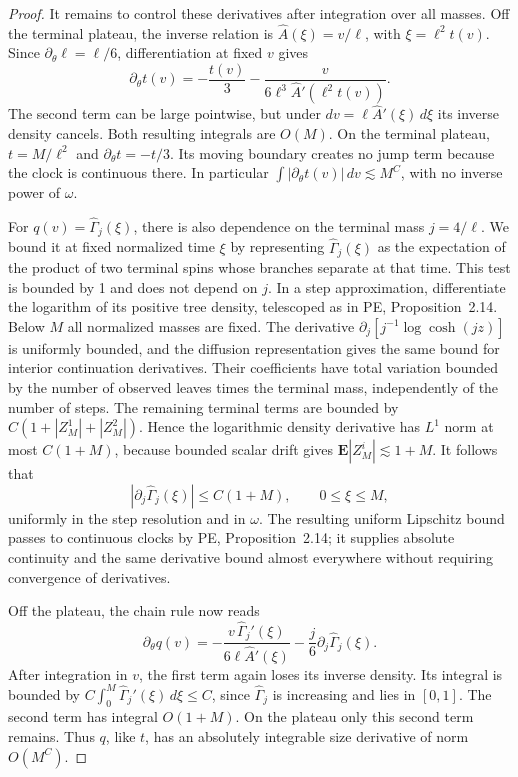\begin{proof}
It remains to control these derivatives after integration over all
masses. Off the terminal plateau, the inverse relation is
\(\widehat A(\xi)=v/\ell\), with \(\xi=\ell^2t(v)\). Since
\(\partial_\theta\ell=\ell/6\), differentiation at fixed \(v\) gives
\[
 \partial_\theta t(v)
 =-\frac{t(v)}3-
   \frac{v}{6\ell^3\widehat A'(\ell^2t(v))}.
\]
The second term can be large pointwise, but under
\(dv=\ell\widehat A'(\xi)\,d\xi\) its inverse density cancels.
Both resulting integrals are \(O(M)\). On the terminal plateau,
\(t=M/\ell^2\) and \(\partial_\theta t=-t/3\). Its moving boundary
creates no jump term because the clock is continuous there. In
particular \(\int|\partial_\theta t(v)|\,dv\lesssim M^C\), with
no inverse power of \(\omega\).

For \(q(v)=\widehat\Gamma_j(\xi)\), there is also dependence on the
terminal mass \(j=4/\ell\). We bound it at fixed normalized time
\(\xi\) by representing \(\widehat\Gamma_j(\xi)\) as the expectation
of the product of two terminal spins whose branches separate at that
time. This test is bounded by 1 and does not depend on \(j\). In a
step approximation, differentiate the logarithm of its positive tree
density, telescoped as in PE, Proposition~2.14. Below \(M\) all
normalized masses are fixed. The derivative
\(\partial_j[j^{-1}\log\cosh(jz)]\) is uniformly bounded, and the
diffusion representation gives the same bound for interior continuation
derivatives. Their coefficients have total variation bounded by the
number of observed leaves times the terminal mass, independently of
the number of steps. The remaining terminal terms are bounded by
\(C(1+|Z_M^1|+|Z_M^2|)\). Hence the logarithmic density derivative
has \(L^1\) norm at most \(C(1+M)\), because bounded scalar drift
gives \(\mathbf E|Z_M^i|\lesssim1+M\). It follows that
\[
 |\partial_j\widehat\Gamma_j(\xi)|\le C(1+M),
 \qquad 0\le\xi\le M,
\]
uniformly in the step resolution and in \(\omega\). The resulting
uniform Lipschitz bound passes to continuous clocks by PE,
Proposition~2.14; it supplies absolute continuity and the same derivative
bound almost everywhere without requiring convergence of derivatives.

Off the plateau, the chain rule now reads
\[
 \partial_\theta q(v)
 =-\frac{v\,\widehat\Gamma_j'(\xi)}
          {6\ell\widehat A'(\xi)}
   -\frac j6\partial_j\widehat\Gamma_j(\xi).
\]
After integration in \(v\), the first term again loses its inverse
density. Its integral is bounded by
\(C\int_0^M\widehat\Gamma_j'(\xi)\,d\xi\le C\), since
\(\widehat\Gamma_j\) is increasing and lies in \([0,1]\). The
second term has integral \(O(1+M)\). On the plateau only this second
term remains. Thus \(q\), like \(t\), has an absolutely integrable
size derivative of norm \(O(M^C)\).

\end{proof}

